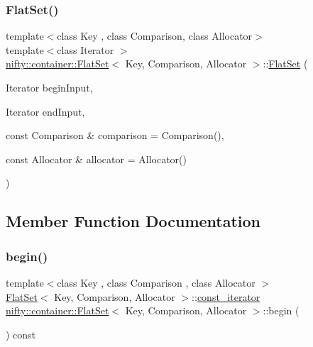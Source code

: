 \subsubsection{\texorpdfstring{Flat\+Set()}{FlatSet()}\hspace{0.1cm}{\footnotesize\ttfamily [3/3]}}
{\footnotesize\ttfamily template$<$class Key , class Comparison, class Allocator$>$ \\
template$<$class Iterator $>$ \\
\hyperlink{classnifty_1_1container_1_1FlatSet}{nifty\+::container\+::\+Flat\+Set}$<$ Key, Comparison, Allocator $>$\+::\hyperlink{classnifty_1_1container_1_1FlatSet}{Flat\+Set} (\begin{DoxyParamCaption}\item[{Iterator}]{begin\+Input,  }\item[{Iterator}]{end\+Input,  }\item[{const Comparison \&}]{comparison = {\ttfamily Comparison()},  }\item[{const Allocator \&}]{allocator = {\ttfamily Allocator()} }\end{DoxyParamCaption})\hspace{0.3cm}{\ttfamily [inline]}}



\subsection{Member Function Documentation}
\mbox{\label{classnifty_1_1container_1_1FlatSet_a08126138beb50522a6ff9e16f242c08e}} 
\subsubsection{\texorpdfstring{begin()}{begin()}\hspace{0.1cm}{\footnotesize\ttfamily [1/2]}}
{\footnotesize\ttfamily template$<$class Key , class Comparison , class Allocator $>$ \\
\hyperlink{classnifty_1_1container_1_1FlatSet}{Flat\+Set}$<$ Key, Comparison, Allocator $>$\+::\hyperlink{classnifty_1_1container_1_1FlatSet_a0f4cd26da060859b18742abfd534aa24}{const\+\_\+iterator} \hyperlink{classnifty_1_1container_1_1FlatSet}{nifty\+::container\+::\+Flat\+Set}$<$ Key, Comparison, Allocator $>$\+::begin (\begin{DoxyParamCaption}{ }\end{DoxyParamCaption}) const\hspace{0.3cm}{\ttfamily [inline]}}

